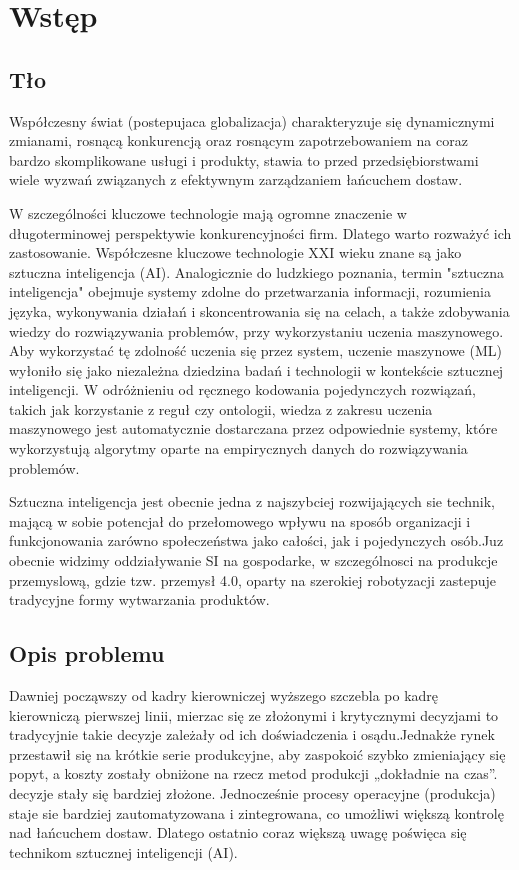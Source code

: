 \newpage %
\section{Wstęp}




\subsection{Tło}

Współczesny świat (postepujaca globalizacja) charakteryzuje się dynamicznymi zmianami, rosnącą konkurencją oraz rosnącym zapotrzebowaniem na coraz bardzo skomplikowane usługi i produkty, stawia to przed przedsiębiorstwami wiele wyzwań związanych z efektywnym zarządzaniem łańcuchem dostaw. 

W szczególności kluczowe technologie mają ogromne znaczenie w długoterminowej perspektywie konkurencyjności firm. Dlatego warto rozważyć ich zastosowanie. Współczesne kluczowe technologie XXI wieku znane są jako sztuczna inteligencja (AI). Analogicznie do ludzkiego poznania, termin "sztuczna inteligencja" obejmuje systemy zdolne do przetwarzania informacji, rozumienia języka, wykonywania działań i skoncentrowania się na celach, a także zdobywania wiedzy do rozwiązywania problemów, przy wykorzystaniu uczenia maszynowego. Aby wykorzystać tę zdolność uczenia się przez system, uczenie maszynowe (ML) wyłoniło się jako niezależna dziedzina badań i technologii w kontekście sztucznej inteligencji. W odróżnieniu od ręcznego kodowania pojedynczych rozwiązań, takich jak korzystanie z reguł czy ontologii, wiedza z zakresu uczenia maszynowego jest automatycznie dostarczana przez odpowiednie systemy, które wykorzystują algorytmy oparte na empirycznych danych do rozwiązywania problemów.\cite{Weinke2023}


 Sztuczna inteligencja jest obecnie jedna z najszybciej rozwijających sie technik, mającą w sobie potencjał do przełomowego wpływu na sposób organizacji i funkcjonowania zarówno społeczeństwa jako całości, jak i pojedynczych osób.Juz obecnie widzimy oddziaływanie SI na gospodarke, w szczególnosci na produkcje przemyslową, gdzie tzw. przemysł 4.0, oparty na szerokiej robotyzacji zastepuje tradycyjne formy wytwarzania produktów.\cite{Nowak2022}


\subsection{Opis problemu}
   Dawniej począwszy od kadry kierowniczej wyższego szczebla po kadrę kierowniczą pierwszej linii,  mierzac się ze złożonymi i krytycznymi decyzjami to tradycyjnie takie decyzje zależały od ich doświadczenia i osądu.Jednakże rynek przestawił się na krótkie serie produkcyjne, aby zaspokoić szybko zmieniający się popyt, a koszty zostały obniżone na rzecz metod produkcji „dokładnie na czas”. decyzje stały się bardziej złożone. Jednocześnie procesy operacyjne (produkcja) staje sie bardziej zautomatyzowana i zintegrowana, co umożliwi większą kontrolę nad łańcuchem dostaw. Dlatego ostatnio coraz większą uwagę poświęca się technikom sztucznej inteligencji (AI).\cite{Wong2013}
   
